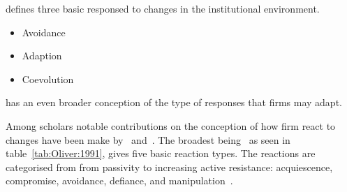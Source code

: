 \cite{Cantwell:2009hg} defines three basic responsed to changes in the institutional environment.

\begin{itemize}
\item Avoidance
\item Adaption
\item Coevolution
\end{itemize}

\cite{Oliver:1991tm} has an even broader conception of the type of responses that firms may adapt.



Among scholars notable contributions on the conception of how firm react to changes have been make by~\cite{Oliver:1991tm} and~\cite{Cantwell:2009hg}.
The broadest being~\cite{Oliver:1991tm} as seen in table~\ref{tab:Oliver:1991}, gives five basic reaction types.
The reactions are categorised from from passivity to increasing active resistance: acquiescence, compromise, avoidance, defiance, and manipulation~\cite{Oliver:1991tm}.\\

